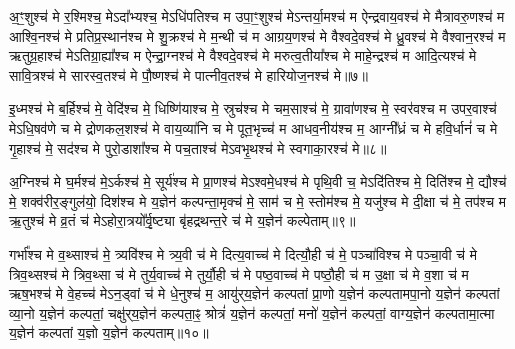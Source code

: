 

अ॒ꣳ॒शुश्च॑ मे र॒श्मिश्च॒ मेऽदा᳚भ्यश्च॒ मेऽधि॑पतिश्च म उपा॒ꣳ॒शुश्च॑ मेऽन्तर्या॒मश्च॑ म ऐन्द्रवाय॒वश्च॑ मे मैत्रावरु॒णश्च॑ म आश्वि॒नश्च॑ मे प्रतिप्र॒स्थान॑श्च मे शु॒क्रश्च॑ मे म॒न्थी च॑ म आग्रय॒णश्च॑ मे वैश्वदे॒वश्च॑ मे ध्रु॒वश्च॑ मे वैश्वान॒रश्च॑ म ऋतुग्र॒हाश्च॑ मेऽतिग्रा॒ह्या᳚श्च म ऐन्द्रा॒ग्नश्च॑ मे वैश्वदे॒वश्च॑ मे मरुत्व॒तीया᳚श्च मे माहे॒न्द्रश्च॑ म आदि॒त्यश्च॑ मे सावि॒त्रश्च॑ मे सारस्व॒तश्च॑ मे पौ॒ष्णश्च॑ मे पात्नीव॒तश्च॑ मे हारियोज॒नश्च॑ मे॥७॥



इ॒ध्मश्च॑ मे ब॒र्हिश्च॑ मे॒ वेदि॑श्च मे॒ धिष्णि॑याश्च मे॒ स्रुच॑श्च मे चम॒साश्च॑ मे॒ ग्रावा॑णश्च मे॒ स्वर॑वश्च म उपर॒वाश्च॑ मेऽधि॒षव॑णे च मे द्रोणकल॒शश्च॑ मे वाय॒व्या॑नि च मे पूत॒भृच्च॑ म आधव॒नीय॑श्च म॒ आग्नी᳚ध्रं च मे हवि॒र्धानं॑ च मे गृ॒हाश्च॑ मे॒ सद॑श्च मे पुरो॒डाशा᳚श्च मे पच॒ताश्च॑ मेऽवभृ॒थश्च॑ मे स्वगाका॒रश्च॑ मे॥८॥



अ॒ग्निश्च॑ मे घ॒र्मश्च॑ मे॒ऽर्कश्च॑ मे॒ सूर्य॑श्च मे प्रा॒णश्च॑ मेऽश्वमे॒धश्च॑ मे पृथि॒वी च॒ मेऽदि॑तिश्च मे॒ दिति॑श्च मे॒ द्यौश्च॑ मे॒ शक्व॑रीर॒ङ्गुल॑यो॒ दिश॑श्च मे य॒ज्ञेन॑ कल्पन्ता॒मृक्च॑ मे॒ साम॑ च मे॒ स्तोम॑श्च मे॒ यजु॑श्च मे दी॒क्षा च॑ मे॒ तप॑श्च म ऋ॒तुश्च॑ मे व्र॒तं च॑ मेऽहोरा॒त्रयो᳚र्वृ॒ष्ट्या बृ॑हद्रथन्त॒रे च॑ मे य॒ज्ञेन॑ कल्पेताम्॥९॥



गर्भा᳚श्च मे व॒थ्साश्च॑ मे॒ त्र्यवि॑श्च मे त्र्य॒वी च॑ मे दित्य॒वाच्च॑ मे दित्यौ॒ही च॑ मे॒ पञ्चा॑विश्च मे पञ्चा॒वी च॑ मे त्रिव॒थ्सश्च॑ मे त्रिव॒थ्सा च॑ मे तुर्य॒वाच्च॑ मे तुर्यौ॒ही च॑ मे पष्ठ॒वाच्च॑ मे पष्ठौ॒ही च॑ म उ॒क्षा च॑ मे व॒शा च॑ म ऋष॒भश्च॑ मे वे॒हच्च॑ मेऽन॒ड्वां च॑ मे धे॒नुश्च॑ म॒ आयु॑र्‌य॒ज्ञेन॑ कल्पतां प्रा॒णो य॒ज्ञेन॑ कल्पतामपा॒नो य॒ज्ञेन॑ कल्पतां व्या॒नो य॒ज्ञेन॑ कल्पतां॒ चक्षु॑र्‌य॒ज्ञेन॑ कल्पता॒ꣴ॒ श्रोत्रं॑ य॒ज्ञेन॑ कल्पतां॒ मनो॑ य॒ज्ञेन॑ कल्पतां॒ वाग्य॒ज्ञेन॑ कल्पतामा॒त्मा य॒ज्ञेन॑ कल्पतां य॒ज्ञो य॒ज्ञेन॑ कल्पताम्॥१०॥

